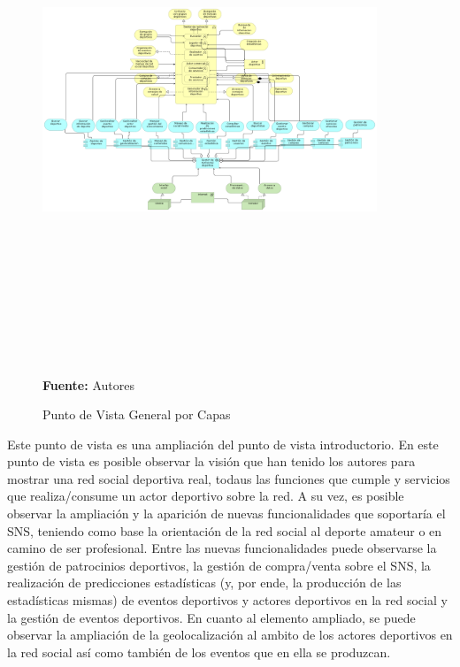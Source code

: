 \begin{figure}[!htb]
  \begin{center}
    \includegraphics[angle=90,width=10cm,height=15cm]{./imagenes/Archimate/vistas/generales/generallayered.png}
    \caption{Punto de Vista General por Capas}
    \label{fig:general_layered}
    \textbf{Fuente:}  Autores \\
  \end{center}
\end{figure}

Este punto de vista es una ampliación del punto de vista introductorio. En este punto de vista es posible observar la visión que han tenido los autores para mostrar una red social deportiva real, todaus las funciones que cumple y servicios que realiza/consume un actor deportivo sobre la red. A su vez, es posible observar la ampliación y la aparición de nuevas funcionalidades que soportaría el SNS, teniendo como base la orientación de la red social al deporte amateur o en camino de ser profesional. Entre las nuevas funcionalidades puede observarse la gestión de patrocinios deportivos, la gestión de compra/venta sobre el SNS, la realización de predicciones estadísticas (y, por ende, la producción de las estadísticas mismas) de eventos deportivos y actores deportivos en la red social y la gestión de eventos deportivos. En cuanto al elemento ampliado, se puede observar la ampliación de la geolocalización al ambito de los actores deportivos en la red social así como también de los eventos que en ella se produzcan.

